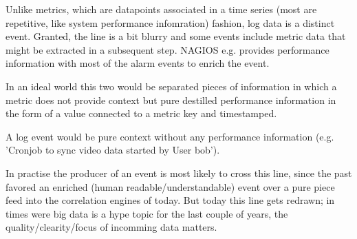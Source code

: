 Unlike metrics, which are datapoints associated in a time series (most are repetitive, like system performance infomration)
fashion, log data is a distinct event. Granted, the line is a bit blurry and some events include metric data that
might be extracted in a subsequent step. NAGIOS e.g. provides performance information with most of the alarm events to enrich the event.

In an ideal world this two would be separated pieces of information in which a metric does not provide context
but pure destilled performance information in the form of a value connected to a metric key and timestamped.

A log event would be pure context without any performance information (e.g. 'Cronjob to sync video data started by User bob'). 

In practise the producer of an event is most likely to cross this line, since the past favored an enriched (human readable/understandable) event over a
pure piece feed into the correlation engines of today. But today this line gets redrawn; in times were big data is a hype topic for the last couple
of years, the quality/clearity/focus of incomming data matters.
